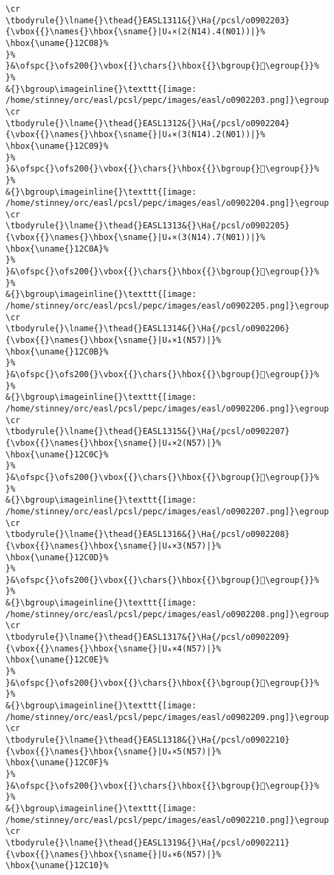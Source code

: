 \begin{verbatim}
\cr
\tbodyrule{}\lname{}\thead{}EASL1311&{}\Ha{/pcsl/o0902203}{\vbox{{}\names{}\hbox{\sname{}|U₄×(2(N14).4(N01))|}%
\hbox{\uname{}12C08}%
}%
}&\ofspc{}\ofs200{}\vbox{{}\chars{}\hbox{{}\bgroup{}𒰈\egroup{}}%
}%
&{}\bgroup\imageinline{}\texttt{[image: /home/stinney/orc/easl/pcsl/pepc/images/easl/o0902203.png]}\egroup
\cr
\tbodyrule{}\lname{}\thead{}EASL1312&{}\Ha{/pcsl/o0902204}{\vbox{{}\names{}\hbox{\sname{}|U₄×(3(N14).2(N01))|}%
\hbox{\uname{}12C09}%
}%
}&\ofspc{}\ofs200{}\vbox{{}\chars{}\hbox{{}\bgroup{}𒰉\egroup{}}%
}%
&{}\bgroup\imageinline{}\texttt{[image: /home/stinney/orc/easl/pcsl/pepc/images/easl/o0902204.png]}\egroup
\cr
\tbodyrule{}\lname{}\thead{}EASL1313&{}\Ha{/pcsl/o0902205}{\vbox{{}\names{}\hbox{\sname{}|U₄×(3(N14).7(N01))|}%
\hbox{\uname{}12C0A}%
}%
}&\ofspc{}\ofs200{}\vbox{{}\chars{}\hbox{{}\bgroup{}𒰊\egroup{}}%
}%
&{}\bgroup\imageinline{}\texttt{[image: /home/stinney/orc/easl/pcsl/pepc/images/easl/o0902205.png]}\egroup
\cr
\tbodyrule{}\lname{}\thead{}EASL1314&{}\Ha{/pcsl/o0902206}{\vbox{{}\names{}\hbox{\sname{}|U₄×1(N57)|}%
\hbox{\uname{}12C0B}%
}%
}&\ofspc{}\ofs200{}\vbox{{}\chars{}\hbox{{}\bgroup{}𒰋\egroup{}}%
}%
&{}\bgroup\imageinline{}\texttt{[image: /home/stinney/orc/easl/pcsl/pepc/images/easl/o0902206.png]}\egroup
\cr
\tbodyrule{}\lname{}\thead{}EASL1315&{}\Ha{/pcsl/o0902207}{\vbox{{}\names{}\hbox{\sname{}|U₄×2(N57)|}%
\hbox{\uname{}12C0C}%
}%
}&\ofspc{}\ofs200{}\vbox{{}\chars{}\hbox{{}\bgroup{}𒰌\egroup{}}%
}%
&{}\bgroup\imageinline{}\texttt{[image: /home/stinney/orc/easl/pcsl/pepc/images/easl/o0902207.png]}\egroup
\cr
\tbodyrule{}\lname{}\thead{}EASL1316&{}\Ha{/pcsl/o0902208}{\vbox{{}\names{}\hbox{\sname{}|U₄×3(N57)|}%
\hbox{\uname{}12C0D}%
}%
}&\ofspc{}\ofs200{}\vbox{{}\chars{}\hbox{{}\bgroup{}𒰍\egroup{}}%
}%
&{}\bgroup\imageinline{}\texttt{[image: /home/stinney/orc/easl/pcsl/pepc/images/easl/o0902208.png]}\egroup
\cr
\tbodyrule{}\lname{}\thead{}EASL1317&{}\Ha{/pcsl/o0902209}{\vbox{{}\names{}\hbox{\sname{}|U₄×4(N57)|}%
\hbox{\uname{}12C0E}%
}%
}&\ofspc{}\ofs200{}\vbox{{}\chars{}\hbox{{}\bgroup{}𒰎\egroup{}}%
}%
&{}\bgroup\imageinline{}\texttt{[image: /home/stinney/orc/easl/pcsl/pepc/images/easl/o0902209.png]}\egroup
\cr
\tbodyrule{}\lname{}\thead{}EASL1318&{}\Ha{/pcsl/o0902210}{\vbox{{}\names{}\hbox{\sname{}|U₄×5(N57)|}%
\hbox{\uname{}12C0F}%
}%
}&\ofspc{}\ofs200{}\vbox{{}\chars{}\hbox{{}\bgroup{}𒰏\egroup{}}%
}%
&{}\bgroup\imageinline{}\texttt{[image: /home/stinney/orc/easl/pcsl/pepc/images/easl/o0902210.png]}\egroup
\cr
\tbodyrule{}\lname{}\thead{}EASL1319&{}\Ha{/pcsl/o0902211}{\vbox{{}\names{}\hbox{\sname{}|U₄×6(N57)|}%
\hbox{\uname{}12C10}%

\end{verbatim}
